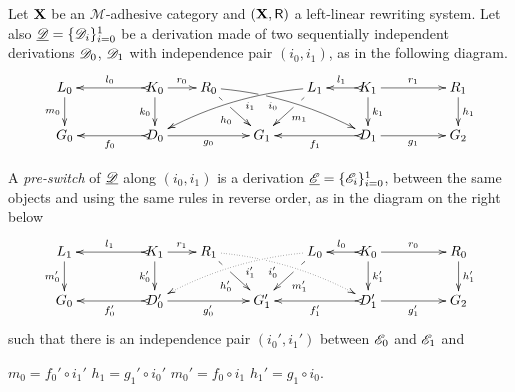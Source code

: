\begin{definition} \label{def:switch}
	Let $\textbf {\textup{X}}$ be an $\mathcal{M}$-adhesive category 
	and $(\textbf {\textup{X}}, \mathsf{R})$ a left-linear rewriting system. 
	Let also
	$\underline{\mathscr{D}}=\{\mathscr{D}_i\}_{i=0}^1$ be a derivation made
	of two sequentially independent derivations $\mathscr{D}_0$,
	$\mathscr{D}_1$ with independence pair $(i_0, i_1)$, as in the following diagram. 
		\[\xymatrix@R=20pt@C=20pt{L_0 \ar[d]_{m_0}&& K_0
		\ar[d]_{k_0}\ar@{>->}[ll]_{l_0} \ar[r]^{r_0} & R_0
		\ar@{>}@/^.25cm/[drrr]|(.32)\hole_(.4){i_0}
		\ar[dr]|(.33)\hole_{h_0} && L_1 \ar@{>}@/_.25cm/[dlll]^(.4){i_1}
		\ar[dl]|(.33)\hole^{m_1}& K_1 \ar[d]^{k_1}\ar@{>->}[l]_{l_1}
		\ar[rr]^{r_1} && R_1 \ar[d]^{h_1}\\G_0 && \ar@{>->}[ll]^{f_0}
		D_0 \ar[rr]_{g_0}&& G_1 && \ar@{>->}[ll]^{f_1} D_1
		\ar[rr]_{g_1}&& G_2}
	\]
	
	
	A \emph{pre-switch} of $\underline{\mathscr{D}}$ along $(i_0,i_1)$ is
	a derivation $\underline{\mathscr{E}}=\{\mathscr{E}_i\}_{i=0}^1$, between the same objects and using the same rules
	in reverse order, as in the diagram on the right below
	\[
	\xymatrix@R=20pt@C=20pt{
		{L_1} \ar[d]_{m_0'}
		&&  {K_1} \ar@{>->}[ll]_{l_1} \ar[r]^{r_1} \ar[d]_{k_0'}
		&  {R_1} \ar[dr]|(.33)\hole_{h_0'}  \ar@/^.25cm/@{.>}_(.4){i_0'}|(.32)\hole[drrr]
		& & 
		{L_0}\ar[dl]|(.33)\hole^{m_1'} \ar@/_.25cm/@{.>}^(.4){i_1'}[dlll] 
		&  {K_0} \ar@{>->}[l]_{l_0} \ar[rr]^{r_0} \ar[d]^{k_1'}
		& & {R_0} \ar[d]^{h_1'} \\		
		{G_0}
		& & {D_0'} \ar@{>->}[ll]^{f_0'} \ar[rr]_{g_0'}
		& &  {G'_1} 
		& &  {D_1'} \ar@{>->}[ll]^{f_1'} \ar[rr]_{g_1'}
		& & {G_2}  }
	\]
	such that there is an independence pair $(i_0', i_1')$ between
	$\mathscr{E}_0$ and $\mathscr{E}_1$ and 
	\begin{center}   
		$m_0=f_0' \circ i_1'$
		\qquad $h_1=g_1' \circ i_0'$
		\qquad $m_0'= f_0 \circ i_1$
		\qquad $h_1'= g_{1}\circ i_0$.
	\end{center}
	

\end{definition}

